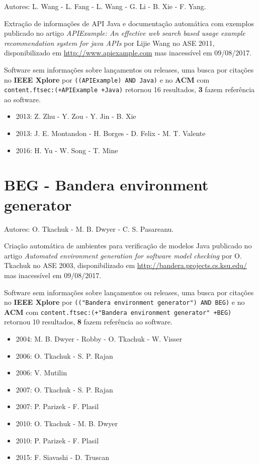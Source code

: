 Autores:
L. Wang - L. Fang - L. Wang - G. Li - B. Xie - F. Yang.

Extração de informações de API Java e documentação automática com exemplos
publicado no artigo {\it APIExample: An effective web search based usage example recommendation system for java APIs}
por Lijie Wang
no ASE 2011,
disponibilizado em \url{http://www.apiexample.com}
mas inacessível em 09/08/2017.

Software sem informações sobre lançamentos ou releases,
uma busca por citações no {\bf IEEE Xplore} por
\texttt{((APIExample) AND Java)}
e no {\bf ACM} com
\texttt{content.ftsec:(+APIExample +Java)}
retornou
16 resultados,
{\bf 3} fazem referência ao software.

\begin{itemize}
\item 2013: Z. Zhu - Y. Zou - Y. Jin - B. Xie
\item 2013: J. E. Montandon - H. Borges - D. Felix - M. T. Valente
\item 2016: H. Yu - W. Song - T. Mine
\end{itemize}

\section{BEG - Bandera environment generator}

Autores:
O. Tkachuk - M. B. Dwyer - C. S. Pasareanu.

Criação automática de ambientes para verificação de modelos Java
publicado no artigo {\it Automated environment generation for software model checking}
por O. Tkachuk
no ASE 2003,
disponibilizado em \url{http://bandera.projects.cs.ksu.edu/}
mas inacessível em 09/08/2017.

Software sem informações sobre lançamentos ou releases,
uma busca por citações no {\bf IEEE Xplore} por
\texttt{(("Bandera environment generator") AND BEG)}
e no {\bf ACM} com
\texttt{content.ftsec:(+"Bandera environment generator" +BEG)}
retornou
10 resultados,
{\bf 8} fazem referência ao software.

\begin{itemize}
\item 2004: M. B. Dwyer - Robby - O. Tkachuk - W. Visser
\item 2006: O. Tkachuk - S. P. Rajan
\item 2006: V. Mutilin
\item 2007: O. Tkachuk - S. P. Rajan
\item 2007: P. Parizek - F. Plasil
\item 2010: O. Tkachuk - M. B. Dwyer
\item 2010: P. Parizek - F. Plasil
\item 2015: F. Siavashi - D. Truscan
\end{itemize}

